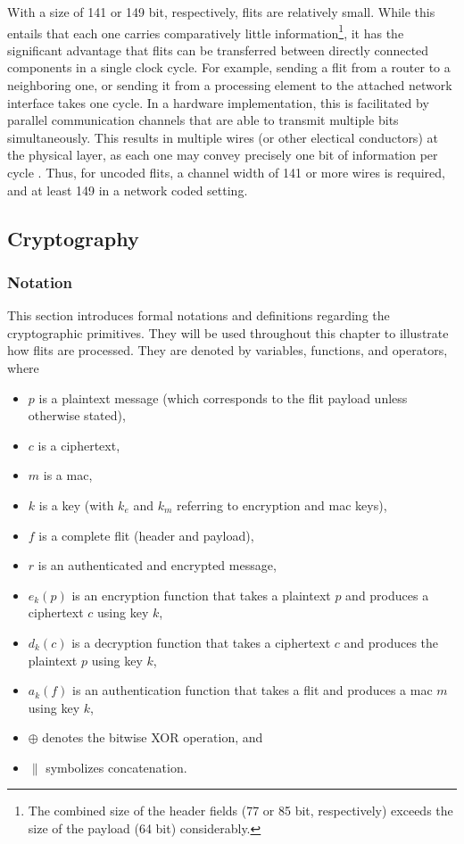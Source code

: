 With a size of 141 or 149 bit, respectively, flits are relatively small. While this entails that each one carries comparatively little
information\footnote{The combined size of the header fields (77 or 85 bit, respectively) exceeds the size of the payload (64 bit) considerably.}, it
has the significant advantage that flits can be transferred between directly connected components in a single clock
cycle. For example, sending a flit from a router to a neighboring one, or sending it from a processing element
to the attached network interface takes one cycle. In a hardware implementation, this is facilitated by parallel communication channels that are able
to transmit multiple bits simultaneously. This results in multiple wires (or other electical conductors) at the physical layer, as each one may convey
precisely one bit of information per cycle \cite{wikiparallelcomm}. Thus, for uncoded flits, a channel width of 141 or more wires is required, and at least 149
in a network coded setting.

\subsection{Cryptography}
\subsubsection{Notation}
This section introduces formal notations and definitions regarding the cryptographic primitives. They will be used throughout this chapter to
illustrate how flits are processed. They are denoted by variables, functions, and operators, where
\begin{itemize}
    \item $p$ is a plaintext message (which corresponds to the flit payload unless otherwise stated),
    \item $c$ is a ciphertext,
    \item $m$ is a \gls{mac},
    \item $k$ is a key (with $k_e$ and $k_m$ referring to encryption and \gls{mac} keys),
    \item $f$ is a complete flit (header and payload),
    \item $r$ is an authenticated and encrypted message,
    \item $e_k(p)$ is an encryption function that takes a plaintext $p$ and produces a ciphertext $c$ using key $k$,
    \item $d_k(c)$ is a decryption function that takes a ciphertext $c$ and produces the plaintext $p$ using key $k$,
    \item $a_k(f)$ is an authentication function that takes a flit and produces a \gls{mac} $m$ using key $k$,
    \item $\oplus$ denotes the bitwise XOR operation, and
    \item $\|$ symbolizes concatenation.
\end{itemize}
\vspace{0.5\baselineskip}

